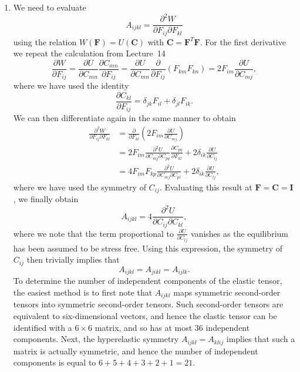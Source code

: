 \documentclass[a4paper,10pt]{paper}
\begin{document}
\begin{enumerate}
\item We need to evaluate
\begin{equation*}
    A_{ijkl}=\frac{\partial^{2}W}{\partial F_{ij}\partial F_{kl}}
\end{equation*}
using the relation $W(\mathbf{F})=U(\mathbf{C})$ with $\mathbf{C}=\mathbf{F}^{T}\mathbf{F}$. For the first derivative we repeat the calculation from Lecture~14
\begin{equation*}
    \frac{\partial W}{\partial F_{ij}}=\frac{\partial U}{\partial C_{mn}}\frac{\partial C_{mn}}{\partial F_{ij}}=\frac{\partial U}{\partial C_{mn}}\frac{\partial}{\partial F_{ij}}(F_{km}F_{kn})=2F_{im}\frac{\partial U}{\partial C_{mj}},
\end{equation*}
where we have used the identity
\begin{equation*}
    \frac{\partial C_{kl}}{\partial F_{ij}}=\delta_{jk}F_{il}+\delta_{jl}F_{ik}.
\end{equation*}
We can then differentiate again in the same manner to obtain
\begin{align*}
    \frac{\partial^2 W}{\partial F_{ij}\partial F_{kl}} &= \frac{\partial}{\partial F_{kl}}\left(2F_{im}\frac{\partial U}{\partial C_{mj}}\right) \\
    &= 2F_{im}\frac{\partial^{2}U}{\partial C_{mj}\partial C_{pq}}\frac{\partial C_{pq}}{\partial F_{kl}}+2\delta_{ik}\frac{\partial U}{\partial C_{lj}} \\
    &= 4F_{im}F_{kp}\frac{\partial^{2}U}{\partial C_{mj}\partial C_{pl}}+2\delta_{ik}\frac{\partial U}{\partial C_{lj}},
\end{align*}
where we have used the symmetry of $C_{ij}$. Evaluating this result at $\mathbf{F}=\mathbf{C}=\mathbf{I}$, we finally obtain
\begin{equation*}
    A_{ijkl}=4\frac{\partial^{2}U}{\partial C_{ij}\partial C_{kl}},
\end{equation*}
where we note that the term proportional to $\frac{\partial U}{\partial C_{lj}}$ vanishes as the equilibrium has been assumed to be stress free. Using this expression, the symmetry of $C_{ij}$ then trivially implies that
\begin{equation*}
    A_{ijkl}=A_{jikl}=A_{ijlk}.
\end{equation*}
To determine the number of independent components of the elastic tensor, the easiest method is to first note that $A_{ijkl}$ maps symmetric second-order tensors into symmetric second-order tensors. Such second-order tensors are equivalent to six-dimensional vectors, and hence the elastic tensor can be identified with a $6\times6$ matrix, and so has at most 36 independent components. Next, the hyperelastic symmetry $A_{ijkl}=A_{klij}$ implies that such a matrix is actually symmetric, and hence the number of independent components is equal to $6+5+4+3+2+1=21$.


\end{enumerate}
\end{document}
